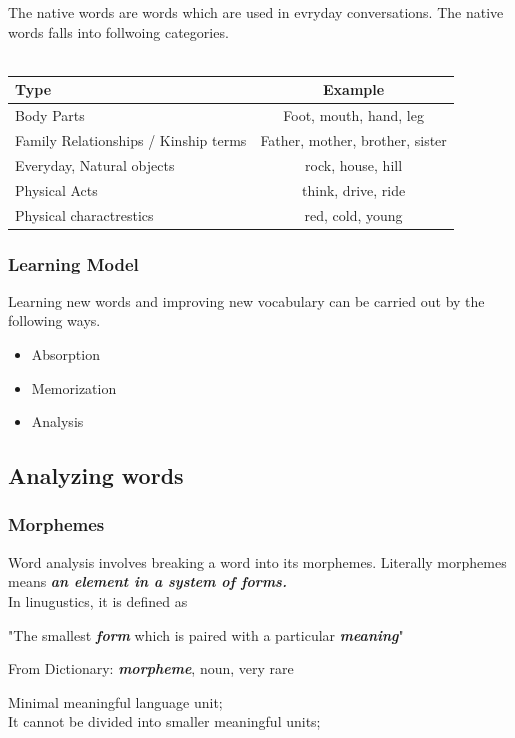 \documentclass[12pt]{article}
\begin{document}
The native words are words which are used in evryday conversations. The native words falls into follwoing categories. \\
\\
\begin{tabular}{| l | c | }
	\hline	
		\textbf{Type} & \textbf{Example} \\
		\hline 		\hline
		Body Parts & Foot, mouth, hand, leg \\ \hline
		Family Relationships / Kinship terms & Father, mother, brother, sister \\ \hline
		Everyday, Natural objects &  rock, house, hill \\ \hline
		Physical Acts &  think, drive, ride \\ \hline
		Physical charactrestics  & red, cold, young \\ \hline 
\end{tabular}
\subsubsection{Learning Model}
Learning new words and improving new vocabulary can be carried out by the following ways.
\begin{itemize}
\item Absorption
\item Memorization
\item Analysis
\end{itemize}

\subsection{Analyzing words}
\subsubsection{Morphemes}
Word analysis involves breaking a word into its morphemes. Literally morphemes means \textbf{\textit{an element in a system of forms.}}\\
In linugustics, it is defined as 
\begin{addmargin}[3em]{2em}%
"The smallest \textbf{\textit{form}} which is paired with a particular \textbf{\textit{meaning}}"
\end{addmargin} 
From Dictionary: \textbf{\textit{morpheme}}, noun, very rare\\
\begin{addmargin}[3em]{2em}%
	Minimal meaningful language unit;\\ 
	It cannot be divided into smaller meaningful units;
\end{addmargin}
\end{document}
